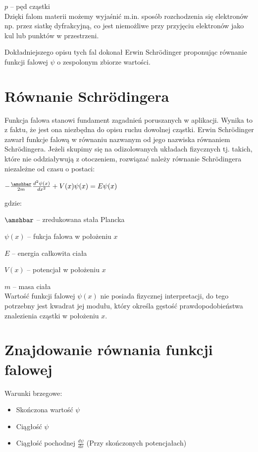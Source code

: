 \documentclass{SGGW-thesis}
\begin{document}
	 $p$ -- pęd cząstki\\
	 
	 Dzięki falom materii możemy wyjaśnić m.in. sposób rozchodzenia się elektronów np. przez siatkę dyfrakcyjną, co jest niemożliwe przy przyjęciu elektronów jako kul lub punktów w przestrzeni.
	 
	 Dokładniejszego opisu tych fal dokonał Erwin Schrödinger proponując równanie funkcji falowej $\psi$ o zespolonym zbiorze wartości. 
	 
	\section{Równanie Schrödingera}
	Funkcja falowa stanowi fundament zagadnień poruszanych w aplikacji. Wynika to z faktu, że jest ona niezbędna do opisu ruchu dowolnej cząstki. Erwin Schrödinger zawarł funkcje falową w równaniu nazwanym od jego nazwiska równaniem Schrödingera.  Jeżeli skupimy się na odizolowanych układach fizycznych tj. takich, które nie oddziaływują z otoczeniem, rozwiązać należy równanie Schrödingera niezależne od czasu o postaci:
	\begin{center}
	{\large $-\frac{\amshbar}{2m} \frac{d^2\psi(x)}{dx^2} + V(x)\psi(x) = E\psi(x)$}
	\end{center}
	gdzie:
	
	$\amshbar$ -- zredukowana stała Plancka
	
	$\psi(x)$ -- fukcja falowa w położeniu $x$
	
	$E$ -- energia całkowita ciała
	
	$V(x)$ -- potencjał w położeniu $x$
	
	$m$ -- masa ciała\\
	
	Wartość funkcji falowej $\psi(x)$ nie posiada fizycznej interpretacji, do tego potrzebny jest kwadrat jej modułu, który określa gęstość prawdopodobieństwa znalezienia cząstki w położeniu $x$. 
	\section{Znajdowanie równania funkcji falowej}
	Warunki brzegowe:
	\begin{itemize}
	\item Skończona wartość $\psi$
	\item Ciągłość $\psi$
	\item Ciągłość pochodnej $\frac{d\psi}{dx}$ (Przy skończonych potencjałach)
	\end{itemize}
	
\end{document}
